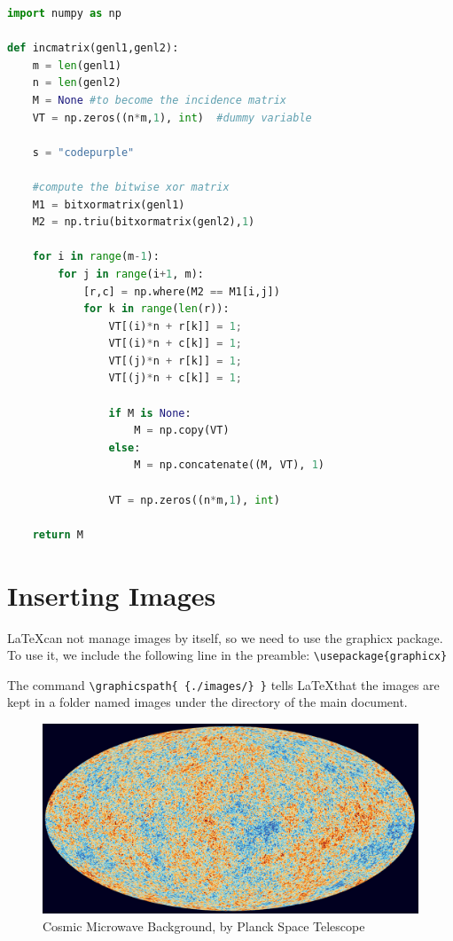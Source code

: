 \documentclass[letterpaper,dvipsnames]{article}
\begin{document}
\lstset{style=python-style}
\begin{lstlisting}[language=Python, caption=Python example]
import numpy as np
    
def incmatrix(genl1,genl2):
    m = len(genl1)
    n = len(genl2)
    M = None #to become the incidence matrix
    VT = np.zeros((n*m,1), int)  #dummy variable

    s = "codepurple"
    
    #compute the bitwise xor matrix
    M1 = bitxormatrix(genl1)
    M2 = np.triu(bitxormatrix(genl2),1) 
    
    for i in range(m-1):
        for j in range(i+1, m):
            [r,c] = np.where(M2 == M1[i,j])
            for k in range(len(r)):
                VT[(i)*n + r[k]] = 1;
                VT[(i)*n + c[k]] = 1;
                VT[(j)*n + r[k]] = 1;
                VT[(j)*n + c[k]] = 1;
    
                if M is None:
                    M = np.copy(VT)
                else:
                    M = np.concatenate((M, VT), 1)
    
                VT = np.zeros((n*m,1), int)
    
    return M
\end{lstlisting}

\newpage

\section{Inserting Images}
\LaTeX can not manage images by itself, so we need to use the graphicx package. 
To use it, we include the following line in the preamble: 
\verb+\usepackage{graphicx}+

The command \verb+\graphicspath{ {./images/} }+ tells \LaTeX that the images 
are kept in a folder named images under the directory of the main document.

\begin{figure}[h]
\includegraphics[width=\textwidth]{cosmic-microwave-background}
\caption{Cosmic Microwave Background, by Planck Space Telescope}
\end{figure}

\newpage

\lstlistoflistings

\listoffigures
\end{document}
